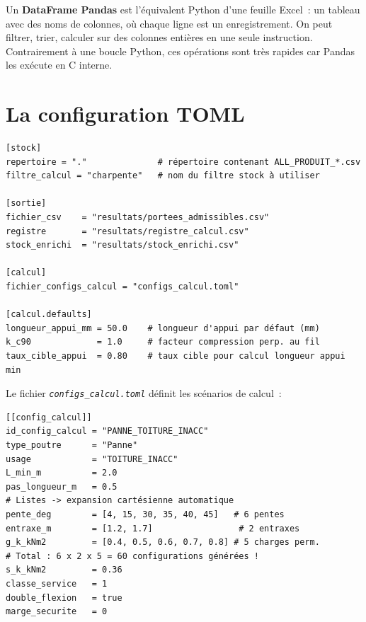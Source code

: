 \documentclass[12pt, a4paper, openany]{book}
\newcommand{\fichier}[1]{\texttt{\textit{#1}}}
\begin{document}
\begin{definition}
Un \textbf{DataFrame Pandas} est l'\'equivalent Python d'une feuille Excel~:
un tableau avec des noms de colonnes, o\`u chaque ligne est un enregistrement.
On peut filtrer, trier, calculer sur des colonnes enti\`eres en une seule
instruction. Contrairement \`a une boucle Python, ces op\'erations sont
tr\`es rapides car Pandas les ex\'ecute en C interne.
\end{definition}

\section{La configuration TOML}

\begin{lstlisting}[style=toml, caption={config.toml --- configuration principale}]
[stock]
repertoire = "."              # répertoire contenant ALL_PRODUIT_*.csv
filtre_calcul = "charpente"   # nom du filtre stock à utiliser

[sortie]
fichier_csv    = "resultats/portees_admissibles.csv"
registre       = "resultats/registre_calcul.csv"
stock_enrichi  = "resultats/stock_enrichi.csv"

[calcul]
fichier_configs_calcul = "configs_calcul.toml"

[calcul.defaults]
longueur_appui_mm = 50.0    # longueur d'appui par défaut (mm)
k_c90             = 1.0     # facteur compression perp. au fil
taux_cible_appui  = 0.80    # taux cible pour calcul longueur appui min
\end{lstlisting}

Le fichier \fichier{configs\_calcul.toml} d\'efinit les sc\'enarios de calcul~:

\begin{lstlisting}[style=toml, caption={configs\_calcul.toml --- scénario panne de toiture}]
[[config_calcul]]
id_config_calcul = "PANNE_TOITURE_INACC"
type_poutre      = "Panne"
usage            = "TOITURE_INACC"
L_min_m          = 2.0
pas_longueur_m   = 0.5
# Listes -> expansion cartésienne automatique
pente_deg        = [4, 15, 30, 35, 40, 45]   # 6 pentes
entraxe_m        = [1.2, 1.7]                 # 2 entraxes
g_k_kNm2         = [0.4, 0.5, 0.6, 0.7, 0.8] # 5 charges perm.
# Total : 6 x 2 x 5 = 60 configurations générées !
s_k_kNm2         = 0.36
classe_service   = 1
double_flexion   = true
marge_securite   = 0
\end{lstlisting}
\end{document}
